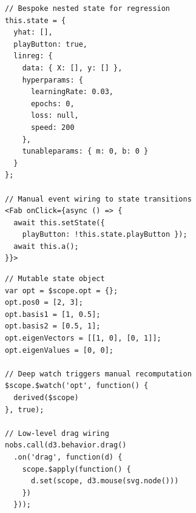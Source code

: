 \clearpage

\begin{minipage}{\textwidth}
\centering
\begin{minipage}[t]{0.48\textwidth}
\begin{lstlisting}[basicstyle=\ttfamily\scriptsize, frame=single, title={Backprop Explainer: deeply nested state object}]
// Bespoke nested state for regression
this.state = {
  yhat: [],
  playButton: true,
  linreg: {
    data: { X: [], y: [] },
    hyperparams: {
      learningRate: 0.03,
      epochs: 0,
      loss: null,
      speed: 200
    },
    tunableparams: { m: 0, b: 0 }
  }
};

// Manual event wiring to state transitions
<Fab onClick={async () => {
  await this.setState({
    playButton: !this.state.playButton });
  await this.a();
}}>
\end{lstlisting}
\end{minipage}
\hfill
\begin{minipage}[t]{0.48\textwidth}
\begin{lstlisting}[basicstyle=\ttfamily\scriptsize, frame=single, title={Eigenvectors: manual derived-value propagation}]
// Mutable state object
var opt = $scope.opt = {};
opt.pos0 = [2, 3];
opt.basis1 = [1, 0.5];
opt.basis2 = [0.5, 1];
opt.eigenVectors = [[1, 0], [0, 1]];
opt.eigenValues = [0, 0];

// Deep watch triggers manual recomputation
$scope.$watch('opt', function() {
  derived($scope)
}, true);

// Low-level drag wiring
nobs.call(d3.behavior.drag()
  .on('drag', function(d) {
    scope.$apply(function() {
      d.set(scope, d3.mouse(svg.node()))
    })
  }));
\end{lstlisting}
\end{minipage}
\label{fig:custom-state}
\end{minipage}


